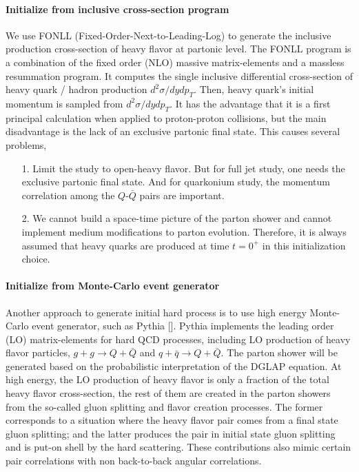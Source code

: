 \paragraph{Initialize from inclusive cross-section program}
We use FONLL (Fixed-Order-Next-to-Leading-Log) to generate the inclusive production cross-section of heavy flavor at partonic level.
The FONLL program is a combination of the fixed order (NLO) massive matrix-elements and a massless resummation program.
It computes the single inclusive differential cross-section of heavy quark / hadron production $d^2\sigma/dydp_T$.
Then, heavy quark's initial momentum is sampled from $d^2\sigma/dydp_T$.
It has the advantage that it is a first principal calculation when applied to proton-proton collisions, but the main disadvantage is the lack of an exclusive partonic final state.
This causes several problems,
\begin{itemize}
\item[1.] Limit the study to open-heavy flavor.
But for full jet study, one needs the exclusive partonic final state. And for quarkonium study, the momentum correlation among the $Q$-$\bar{Q}$ pairs are important.
\item[2.] We cannot build a space-time picture of the parton shower and cannot implement medium modifications to parton evolution. 
Therefore, it is always assumed that heavy quarks are produced at time $t=0^{+}$ in this initialization choice.
\end{itemize}
\paragraph{Initialize from Monte-Carlo event generator}
Another approach to generate initial hard process is to use high energy Monte-Carlo event generator, such as Pythia [].
Pythia implements the leading order (LO) matrix-elements for hard QCD processes, including LO production of heavy flavor particles,
$g+g\rightarrow Q+\bar{Q}$ and $q+\bar{q}\rightarrow Q+\bar{Q}$.
The parton shower will be generated based on the probabilistic interpretation of the DGLAP equation.
At high energy, the LO production of heavy flavor is only a fraction of the total heavy flavor cross-section, the rest of them are created in the parton showers from the so-called gluon splitting and flavor creation processes.
The former corresponds to a situation where the heavy flavor pair comes from a final state gluon splitting; and the latter produces the pair in initial state gluon splitting and is put-on shell by the hard scattering.
These contributions also mimic certain pair correlations with non back-to-back angular correlations.

